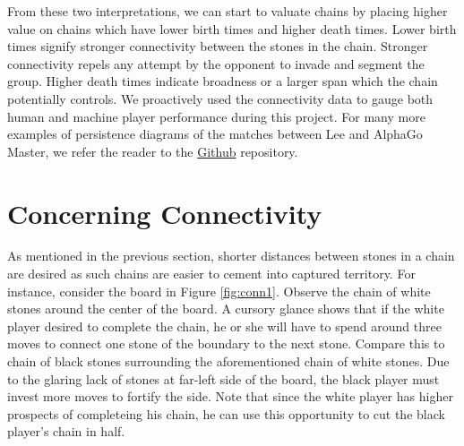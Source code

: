 \documentclass[11pt]{article}
\begin{document}
From these two interpretations, we can start to valuate chains by placing higher value on chains which have lower birth times and higher death times. Lower birth times signify stronger connectivity between the stones in the chain. Stronger connectivity repels any attempt by the opponent to invade and segment the group. Higher death times indicate broadness or a larger span which the chain potentially controls. We proactively used the connectivity data to gauge both human and machine player performance during this project. For many more examples of persistence diagrams of the matches between Lee and AlphaGo Master, we refer the reader to the \href{https://github.com/ekim1919/TDAGo/tree/master/results/LSDAlpha}{Github} repository.

\section{Concerning Connectivity}

As mentioned in the previous section, shorter distances between stones in a chain are desired as such chains are easier to cement into captured territory. For instance, consider the board in Figure \ref{fig:conn1}. Observe the chain of white stones around the center of the board. A cursory glance shows that if the white player desired to complete the chain, he or she will have to spend around three moves to connect one stone of the boundary to the next stone. Compare this to chain of black stones surrounding the aforementioned chain of white stones. Due to the glaring lack of stones at far-left side of the board, the black player must invest more moves to fortify the side. Note that since the white player has higher prospects of completeing his chain, he can use this opportunity to cut the black player's chain in half.
\end{document}

